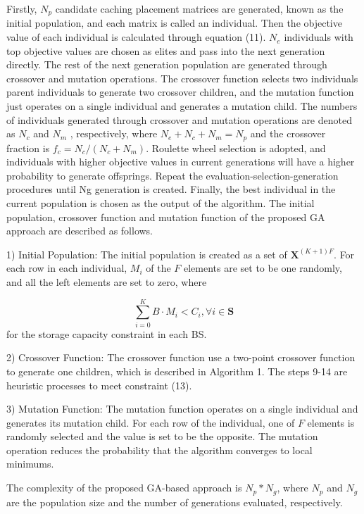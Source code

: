 \documentclass[conference]{IEEEtran}
\begin{document}
Firstly, $N_p$ candidate caching placement matrices are generated, known as the initial population, and each matrix is called an individual. Then the objective value of each individual is calculated through equation (11). $N_e$ individuals with top objective values are chosen as elites and pass into the next generation directly. The rest of the next generation population are generated through crossover and mutation operations. The crossover function selects two individuals parent individuals to generate two crossover children, and the mutation function just operates on a single individual and generates a mutation child. The numbers of individuals generated through crossover and mutation operations are denoted as $N_c$ and $N_m$ , respectively, where $N_e+N_c+N_m=N_p$ and the crossover fraction is $f_c=N_c/ (N_c+N_m)$. Roulette wheel selection is adopted, and individuals with higher objective values in current generations will have a higher probability to generate offsprings. Repeat the evaluation-selection-generation procedures until Ng generation is created. Finally, the best individual in the current population is chosen as the output of the algorithm. The initial population, crossover function and mutation function of the proposed GA approach are described as follows.

1)	Initial Population: The initial population is created as a set of $\mathbf{X}^{(K+1)F}$. For each row in each individual, $M_i$ of the $F$ elements are set to be one randomly, and all the left elements are set to zero, where

\begin{equation}
\sum_{i=0}^K B\cdot M_i <C_i, \forall{i}\in\mathbf{S}
\end{equation}
for the storage capacity constraint in each BS.

2)	Crossover Function: The crossover function use a two-point crossover function to generate one children, which is described in Algorithm 1. The steps 9-14 are heuristic processes to meet constraint (13).

3)	Mutation Function: The mutation function operates on a single individual and generates its mutation child. For each row of the individual, one of $F$ elements is randomly selected and the value is set to be the opposite. The mutation operation reduces the probability that the algorithm converges to local minimums.

The complexity of the proposed GA-based approach is $N_p\ast N_g$, where $ N_p$ and $N_g$ are the population size and the number of generations evaluated, respectively.
\end{document}
